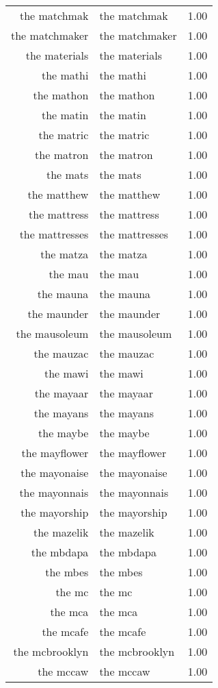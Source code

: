 \begin{table}[ht]
\begin{tabular}{rlr}
  the matchmak & the matchmak & 1.00 \\ 
  the matchmaker & the matchmaker & 1.00 \\ 
  the materials & the materials & 1.00 \\ 
  the mathi & the mathi & 1.00 \\ 
  the mathon & the mathon & 1.00 \\ 
  the matin & the matin & 1.00 \\ 
  the matric & the matric & 1.00 \\ 
  the matron & the matron & 1.00 \\ 
  the mats & the mats & 1.00 \\ 
  the matthew & the matthew & 1.00 \\ 
  the mattress & the mattress & 1.00 \\ 
  the mattresses & the mattresses & 1.00 \\ 
  the matza & the matza & 1.00 \\ 
  the mau & the mau & 1.00 \\ 
  the mauna & the mauna & 1.00 \\ 
  the maunder & the maunder & 1.00 \\ 
  the mausoleum & the mausoleum & 1.00 \\ 
  the mauzac & the mauzac & 1.00 \\ 
  the mawi & the mawi & 1.00 \\ 
  the mayaar & the mayaar & 1.00 \\ 
  the mayans & the mayans & 1.00 \\ 
  the maybe & the maybe & 1.00 \\ 
  the mayflower & the mayflower & 1.00 \\ 
  the mayonaise & the mayonaise & 1.00 \\ 
  the mayonnais & the mayonnais & 1.00 \\ 
  the mayorship & the mayorship & 1.00 \\ 
  the mazelik & the mazelik & 1.00 \\ 
  the mbdapa & the mbdapa & 1.00 \\ 
  the mbes & the mbes & 1.00 \\ 
  the mc & the mc & 1.00 \\ 
  the mca & the mca & 1.00 \\ 
  the mcafe & the mcafe & 1.00 \\ 
  the mcbrooklyn & the mcbrooklyn & 1.00 \\ 
  the mccaw & the mccaw & 1.00 \\ 

\end{tabular}
\end{table}
